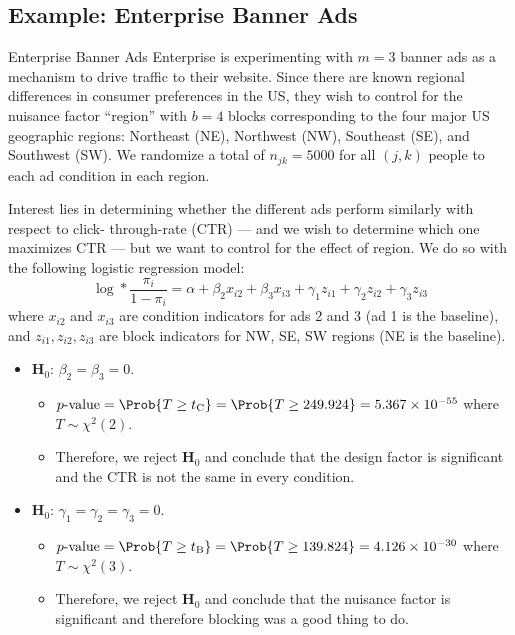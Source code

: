 \subsection{Example: Enterprise Banner Ads}
\begin{Example}{Enterprise Banner Ads}{}
      Enterprise is experimenting with $m = 3$ banner ads as a mechanism to drive traffic to their website. Since
      there are known regional differences in consumer preferences in the US, they wish to control for the nuisance
      factor ``region'' with $b = 4$ blocks corresponding to the four major US geographic regions: Northeast (NE),
      Northwest (NW), Southeast (SE), and Southwest (SW). We randomize a total of $n_{jk} = 5000$ for all $ (j,k) $ people
      to each ad condition in each region.

      \vspace{2mm}

      Interest lies in determining whether the different ads perform similarly with respect to click-
      through-rate (CTR) --- and we wish to determine which one maximizes CTR --- but we want to control for
      the effect of region. We do so with the following logistic regression model:
      \[ \log*{\frac{\pi_i}{1-\pi_i}}=\alpha+\beta_2 x_{i2}+\beta_3 x_{i3}+\gamma_1 z_{i1}+\gamma_2 z_{i2}+\gamma_3 z_{i3} \]
      where $ x_{i2} $ and $ x_{i3} $ are condition indicators for ads 2 and 3 (ad 1 is the baseline),
      and $ z_{i1},z_{i2},z_{i3} $ are block indicators for NW, SE, SW regions (NE is the baseline).
      \begin{itemize}
            \item $ \mathbf{H}_0 $: $ \beta_2=\beta_3=0 $.
                  \begin{itemize}
                        \item $ p\text{-value}=\Prob{T\ge t_\text{C}}=\Prob{T\ge 249.924}=5.367\times 10^{-55} $ where $ T \sim \chi^2(2) $.
                        \item Therefore, we reject $ \mathbf{H}_0 $ and conclude that the design factor is significant and the CTR is not
                              the same in every condition.
                  \end{itemize}
            \item $ \mathbf{H}_0 $: $ \gamma_1=\gamma_2=\gamma_3=0 $.
                  \begin{itemize}
                        \item $ p\text{-value}=\Prob{T\ge t_\text{B}}=\Prob{T\ge 139.824}=4.126\times 10^{-30} $ where $ T \sim \chi^2(3) $.
                        \item Therefore, we reject $ \mathbf{H}_0 $ and conclude that the nuisance factor is significant
                              and therefore blocking was a good thing to do.
                  \end{itemize}
      \end{itemize}
\end{Example}
